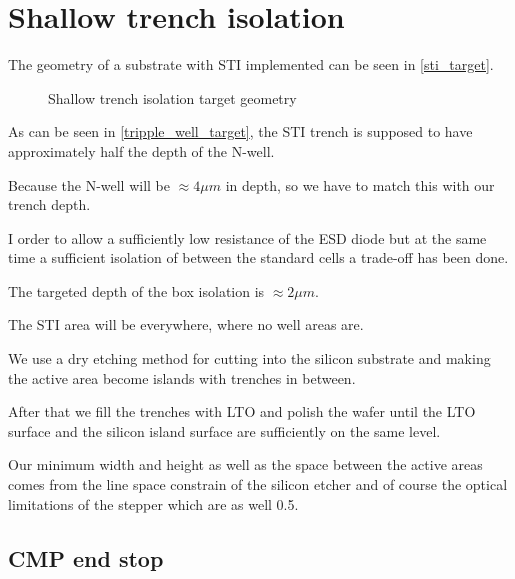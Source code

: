 \section{Shallow trench isolation}\label{sti_chapter}
The geometry of a substrate with STI implemented can be seen in \autoref{sti_target}.

\begin{figure}[H]
	\centering
	\begin{tikzpicture}[node distance = 3cm, auto, thick,scale=\CrossAndTopSectionBig, every node/.style={transform shape}]
		
	\end{tikzpicture}
	\begin{tikzpicture}[node distance = 3cm, auto, thick,scale=\CrossAndTopSectionBig, every node/.style={transform shape}]
		
	\end{tikzpicture}
	\caption{Shallow trench isolation target geometry}
	\label{sti_target}
\end{figure}

As can be seen in \autoref{tripple_well_target}, the STI trench is supposed to have approximately half the depth of the N-well.

Because the N-well will be $\approx 4 \mu m$ in depth, so we have to match this with our trench depth.

I order to allow a sufficiently low resistance of the ESD diode but at the same time a sufficient isolation of between the standard cells a trade-off has been done.

The targeted depth of the box isolation is $\approx 2 \mu m$.

The STI area will be everywhere, where no well areas are.

We use a dry etching method for cutting into the silicon substrate and making the active area become islands with trenches in between.

After that we fill the trenches with LTO and polish the wafer until the LTO surface and the silicon island surface are sufficiently on the same level.

Our minimum width and height as well as the space between the active areas comes from the line space constrain of the silicon etcher and of course the optical limitations of the stepper which are as well 0.5\um.

\newpage

\subsection{CMP end stop}\label{sti_end_stop}

